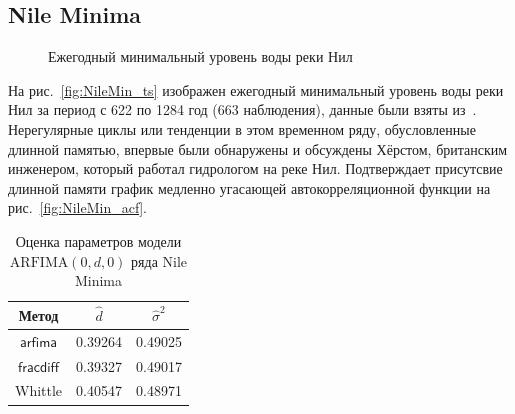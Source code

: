 \documentclass[specialist,
substylefile = spbu_report.rtx,
subf,href,colorlinks=true, 12pt]{disser}
\theoremstyle{definition}
\begin{document}
\subsection{Nile Minima}
\begin{figure}[h!]
	\centering
	\caption{Ежегодный минимальный уровень воды реки Нил}
\end{figure}

На рис.~\ref{fig:NileMin_ts} изображен ежегодный минимальный уровень воды реки Нил за период с 622 по 1284 год (663 наблюдения), данные были взяты из~\cite{Beran1994}. Нерегулярные циклы или тенденции в этом временном ряду, обусловленные длинной памятью, впервые были обнаружены и обсуждены Хёрстом, британским инженером, который работал гидрологом на реке Нил. Подтверждает присутсвие длинной памяти график медленно угасающей автокорреляционной функции на рис.~\ref{fig:NileMin_acf}.

\begin{table}[t]
	\centering
	\caption{Оценка параметров модели $\mathrm{ARFIMA}(0, d, 0)$ ряда Nile Minima}
	\label{tab:NileMin_est}
	\begin{tabular}{|c|c|c|}
		\hline
		Метод & $\hat{d}$ & $\hat{\sigma}^2$ \\
		\hline
		$\mathsf{arfima}$ & 0.39264 & 0.49025 \\
		$\mathsf{fracdiff}$ & 0.39327 & 0.49017 \\
		Whittle & 0.40547 & 0.48971 \\
		\hline
	\end{tabular}
\end{table}
\end{document}
